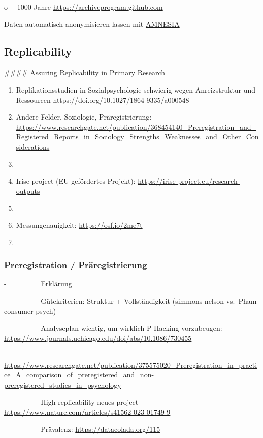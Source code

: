 \documentclass[
  letterpaper,
  DIV=11,
  numbers=noendperiod]{scrreprt}
\begin{document}
o~~ 1000 Jahre \url{https://archiveprogram.github.com}

Daten automatisch anonymisieren lassen mit
\href{https://amnesia.openaire.eu/}{AMNESIA}

\subsection{Replicability}\label{replicability}

\#\#\#\# Assuring Replicability in Primary Research

\begin{enumerate}
\def\labelenumi{\arabic{enumi}.}
\item
  Replikationsstudien in Sozialpsychologie schwierig wegen
  Anreizstruktur und Ressourcen
  https://doi.org/10.1027/1864-9335/a000548
\item
  Andere Felder, Soziologie, Präregistrierung:
  \url{https://www.researchgate.net/publication/368454140_Preregistration_and_Registered_Reports_in_Sociology_Strengths_Weaknesses_and_Other_Considerations}
\item
\item
  Irise project (EU-gefördertes Projekt):
  \url{https://irise-project.eu/research-outputs}
\item
\item
  Messungenauigkeit: \url{https://osf.io/2me7t}
\item
\end{enumerate}

\subsubsection{Preregistration /
Präregistrierung}\label{preregistration-pruxe4registrierung}

-~~~~~~~~~ Erklärung

-~~~~~~~~~ Gütekriterien: Struktur + Vollständigkeit (simmons nelson
vs.~Pham consumer psych)

-~~~~~~~~~ Analyseplan wichtig, um wirklich P-Hacking vorzubeugen:
\url{https://www.journals.uchicago.edu/doi/abs/10.1086/730455}

-~~~~~~~~~
\url{https://www.researchgate.net/publication/375575020_Preregistration_in_practice_A_comparison_of_preregistered_and_non-preregistered_studies_in_psychology}

-~~~~~~~~~ High replicability neues project
\url{https://www.nature.com/articles/s41562-023-01749-9}

-~~~~~~~~~ Prävalenz: \url{https://datacolada.org/115}
\end{document}
